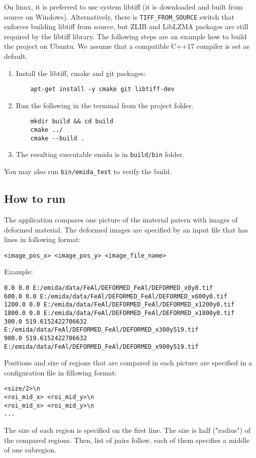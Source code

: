 On linux, it is preferred to use system libtiff (it is downloaded and built from source on Windows). Alternatively, there is \texttt{TIFF\_FROM\_SOURCE} switch that enforces building libtiff from source, but ZLIB and LibLZMA packages are still required by the libtiff library. The following steps are an example how to build the project on Ubuntu. We assume that a compatible C++17 compiler is set as default.
\begin{enumerate}
	\item Install the libtiff, cmake and git packages: 
	\begin{verbatim}
	apt-get install -y cmake git libtiff-dev
	\end{verbatim}
	\item Run the following in the terminal from the project folder.
	\begin{verbatim}
	mkdir build && cd build
	cmake ../
	cmake --build .
	\end{verbatim}
	\item The resulting executable emida is in \texttt{build/bin} folder.
\end{enumerate}
You may also run \texttt{bin/emida\_test} to verify the build.

\subsection*{How to run}

The application compares one picture of the material patern with images of deformed material. The deformed images are specified by an input file that has lines in following format:
\begin{verbatim}
<image_pos_x> <image_pos_y> <image_file_name>
\end{verbatim}
Example:
\begin{verbatim}
0.0 0.0 E:/emida/data/FeAl/DEFORMED_FeAl/DEFORMED_x0y0.tif
600.0 0.0 E:/emida/data/FeAl/DEFORMED_FeAl/DEFORMED_x600y0.tif
1200.0 0.0 E:/emida/data/FeAl/DEFORMED_FeAl/DEFORMED_x1200y0.tif
1800.0 0.0 E:/emida/data/FeAl/DEFORMED_FeAl/DEFORMED_x1800y0.tif
300.0 519.6152422706632 E:/emida/data/FeAl/DEFORMED_FeAl/DEFORMED_x300y519.tif
900.0 519.6152422706632 E:/emida/data/FeAl/DEFORMED_FeAl/DEFORMED_x900y519.tif
\end{verbatim}
Positions and size of regions that are compared in each picture are specified in a configuration file in fillowing format:
\begin{verbatim}
<size/2>\n
<roi_mid_x> <roi_mid_y>\n
<roi_mid_x> <roi_mid_y>\n
...
\end{verbatim}
The size of each region is specified on the first line. The size is half ("radius") of the compared regions. Then, list of pairs follow, each of them specifies a middle of one subregion.

